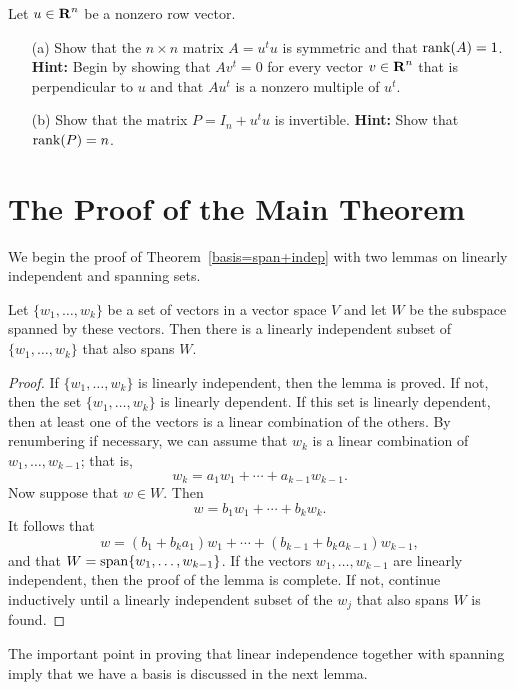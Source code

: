 \documentclass{ximera}
\begin{document}
\begin{exercise} \label{c5.5.7}
Let $u\in\mbox{$\bf{R}$}^n$ be a nonzero row vector.
\begin{itemize}
\item[(a)]  Show that the $n\times n$ matrix $A=u^tu$ is symmetric and that
${\rm rank}(A)=1$.  {\bf Hint:}  Begin by showing that $Av^t=0$ for every vector
$v\in\mbox{$\bf{R}$}^n$ that is perpendicular to $u$ and that $Au^t$ is a nonzero multiple
of $u^t$.
\item[(b)]  Show that the matrix $P=I_n+u^tu$ is invertible.  {\bf Hint:}
Show that ${\rm rank}(P)=n$.
\end{itemize}
\end{exercise}


\section{The Proof of the Main Theorem} \label{S:5.6}

We begin the proof of Theorem~\ref{basis=span+indep} with two
lemmas on linearly independent and spanning sets.

\begin{lemma}  \label{reducetoindep}
Let $\{w_1,\ldots,w_k\}$ be a set of vectors in a vector space
$V$ and let $W$ be the subspace spanned by these vectors.  Then
there is a linearly independent subset of $\{w_1,\ldots,w_k\}$
that also spans $W$.
\end{lemma}

\begin{proof} If $\{w_1,\ldots,w_k\}$ is linearly independent, then the
lemma is proved.  If not, then the set $\{w_1,\ldots,w_k\}$ is
linearly dependent.  If this set is linearly dependent, then at
least one of the vectors is a linear combination of the others.
By renumbering if necessary, we can assume that $w_k$ is a
linear combination of $w_1,\ldots,w_{k-1}$; that is,
\[
w_k = a_1w_1 + \cdots + a_{k-1}w_{k-1}.
\]
Now suppose that $w\in W$.  Then
\[
w = b_1w_1 + \cdots + b_kw_k.
\]
It follows that
\[
w = (b_1+b_ka_1)w_1 + \cdots + (b_{k-1}+b_ka_{k-1})w_{k-1},
\]
and that $W={\rm span}\{w_1,\ldots,w_{k-1}\}$.  If the vectors
$w_1,\ldots,w_{k-1}$ are linearly independent, then the proof of
the lemma is complete.  If not, continue inductively until a
linearly independent subset of the $w_j$ that also spans $W$ is
found.  \end{proof}

The important point in proving that linear independence together
with spanning imply that we have a basis is discussed in the next
lemma.
\end{document}
